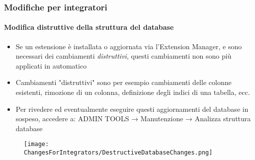 
\begin{frame}[fragile]
	\frametitle{Modifiche per integratori}
	\framesubtitle{Modifica distruttive della struttura del database}

	\begin{itemize}
		\item Se un estensione è installata o aggiornata via l'Extension Manager,
			e sono necessari dei cambiamenti \textit{distruttivi}, questi cambiamenti
			non sono più applicati in automatico
		\item Cambiamenti "distruttivi" sono per esempio cambiamenti delle colonne esistenti,
			rimozione di un colonna, definizione degli indici di una tabella, ecc.
		\item Per rivedere ed eventualmente eseguire questi aggiornamenti del database in sospeso,
			accedere a: ADMIN TOOLS → Manutenzione → Analizza struttura database\newline
	\end{itemize}

	\vspace{-0.4cm}


	\begin{figure}
		\texttt{[image: ChangesForIntegrators/DestructiveDatabaseChanges.png]}
	\end{figure}

\end{frame}


